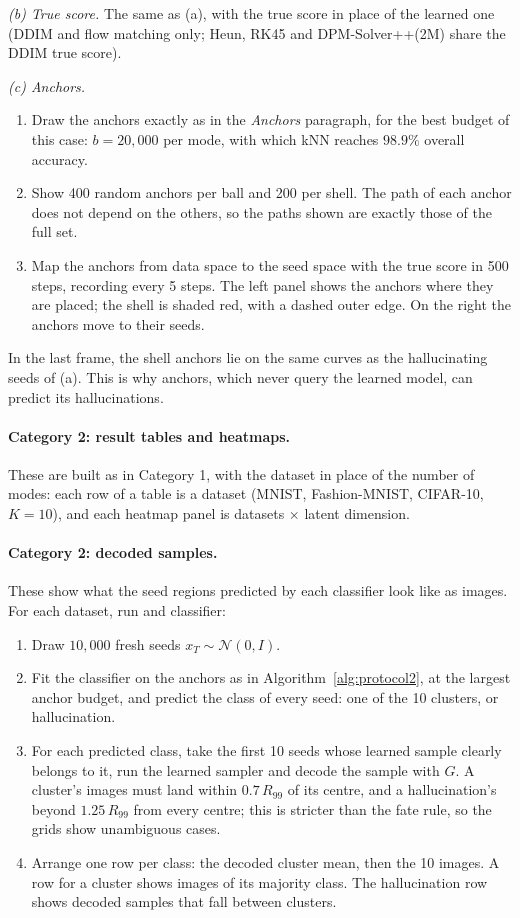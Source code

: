 \documentclass[11pt]{article}
\begin{document}
\textit{(b) True score.} The same as (a), with the true score in place of the learned one (DDIM
and flow matching only; Heun, RK45 and DPM-Solver++(2M) share the DDIM true score).

\textit{(c) Anchors.}
\begin{enumerate}
    \item Draw the anchors exactly as in the \emph{Anchors} paragraph, for the best budget of this
    case: $b = 20{,}000$ per mode, with which kNN reaches $98.9\%$ overall accuracy.
    \item Show 400 random anchors per ball and 200 per shell. The path of each anchor does not
    depend on the others, so the paths shown are exactly those of the full set.
    \item Map the anchors from data space to the seed space with the true score in 500 steps,
    recording every 5 steps. The left panel shows the anchors where they are placed; the shell is
    shaded red, with a dashed outer edge. On the right the anchors move to their seeds.
\end{enumerate}
In the last frame, the shell anchors lie on the same curves as the hallucinating seeds of (a).
This is why anchors, which never query the learned model, can predict its hallucinations.

\paragraph{Category 2: result tables and heatmaps.}
These are built as in Category 1, with the dataset in place of the number of modes: each row of a
table is a dataset (MNIST, Fashion-MNIST, CIFAR-10, $K = 10$), and each heatmap panel is
datasets $\times$ latent dimension.

\paragraph{Category 2: decoded samples.}
These show what the seed regions predicted by each classifier look like as images. For each
dataset, run and classifier:
\begin{enumerate}
    \item Draw $10{,}000$ fresh seeds $x_T \sim \mathcal{N}(0, I)$.
    \item Fit the classifier on the anchors as in Algorithm~\ref{alg:protocol2}, at the largest
    anchor budget, and predict the class of every seed: one of the 10 clusters, or hallucination.
    \item For each predicted class, take the first 10 seeds whose learned sample clearly belongs to
    it, run the learned sampler and decode the sample with $G$. A cluster's images must land within
    $0.7\,R_{99}$ of its centre, and a hallucination's beyond $1.25\,R_{99}$ from every centre; this
    is stricter than the fate rule, so the grids show unambiguous cases.
    \item Arrange one row per class: the decoded cluster mean, then the 10 images. A row for a
    cluster shows images of its majority class. The hallucination row shows decoded samples that
    fall between clusters.
\end{enumerate}
\end{document}
